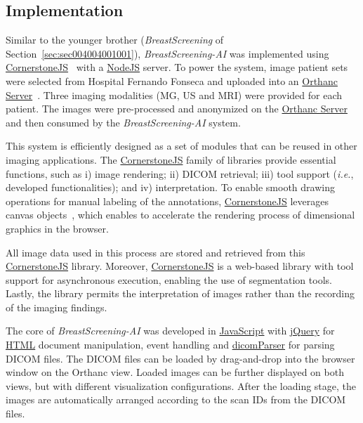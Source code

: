 \subsection{Implementation}
\label{sec:sec005004001}

Similar to the younger brother ({\it BreastScreening} of Section~\ref{sec:sec004004001001}), {\it BreastScreening-AI} was implemented using \href{https://cornerstonejs.org/}{CornerstoneJS}~\cite{urban2017lesiontracker} with a \href{https://nodejs.org/}{NodeJS} server.
To power the system, image patient sets were selected from Hospital Fernando Fonseca and uploaded into an \href{https://www.orthanc-server.com}{Orthanc Server}~\cite{Jodogne2018}.
Three imaging modalities (\ac{MG}, \ac{US} and \ac{MRI}) were provided for each patient.
The images were pre-processed and anonymized on the \href{https://www.orthanc-server.com}{Orthanc Server} and then consumed by the {\it BreastScreening-AI} system.

This system is efficiently designed as a set of modules that can be reused in other imaging applications.
The \href{https://cornerstonejs.org/}{CornerstoneJS} family of libraries provide essential functions, such as i) image rendering; ii) DICOM retrieval; iii) tool support ({\it i.e.}, developed functionalities); and iv) interpretation.
To enable smooth drawing operations for manual labeling of the annotations, \href{https://cornerstonejs.org/}{CornerstoneJS} leverages canvas objects~\cite{mullie2019coreslicer}, which enables to accelerate the rendering process of dimensional graphics in the browser.

All image data used in this process are stored and retrieved from this \href{https://cornerstonejs.org/}{CornerstoneJS} library.
Moreover, \href{https://cornerstonejs.org/}{CornerstoneJS} is a web-based library with tool support for asynchronous execution, enabling the use of segmentation tools.
Lastly, the library permits the interpretation of images rather than the recording of the imaging findings.

The core of {\it BreastScreening-AI} was developed in \href{https://www.w3schools.com/js/}{JavaScript} with \href{https://jquery.com/}{jQuery} for \href{https://www.w3schools.com/html/}{HTML} document manipulation, event handling and \href{https://github.com/cornerstonejs/dicomParser}{dicomParser} for parsing DICOM files.
The DICOM files can be loaded by drag-and-drop into the browser window on the Orthanc view.
Loaded images can be further displayed on both views, but with different visualization configurations.
After the loading stage, the images are automatically arranged according to the scan IDs from the DICOM files.

